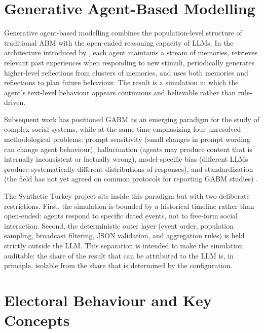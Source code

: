 \documentclass[12pt,a4paper]{report}
\begin{document}
\section{Generative Agent-Based Modelling}
\label{sec:gabm}

Generative agent-based modelling combines the population-level structure of traditional ABM with the open-ended reasoning capacity of LLMs. In the architecture introduced by \citet{park2023generative}, each agent maintains a stream of memories, retrieves relevant past experiences when responding to new stimuli, periodically generates higher-level reflections from clusters of memories, and uses both memories and reflections to plan future behaviour. The result is a simulation in which the agent's text-level behaviour appears continuous and believable rather than rule-driven.

Subsequent work has positioned GABM as an emerging paradigm for the study of complex social systems, while at the same time emphasizing four unresolved methodological problems: prompt sensitivity (small changes in prompt wording can change agent behaviour), hallucination (agents may produce content that is internally inconsistent or factually wrong), model-specific bias (different LLMs produce systematically different distributions of responses), and standardization (the field has not yet agreed on common protocols for reporting GABM studies) \citep{gao2024llmabm,lu2024gabs}.

The Synthetic Turkey project sits inside this paradigm but with two deliberate restrictions. First, the simulation is bounded by a historical timeline rather than open-ended: agents respond to specific dated events, not to free-form social interaction. Second, the deterministic outer layer (event order, population sampling, broadcast filtering, JSON validation, and aggregation rules) is held strictly outside the LLM. This separation is intended to make the simulation auditable: the share of the result that can be attributed to the LLM is, in principle, isolable from the share that is determined by the configuration.

\section{Electoral Behaviour and Key Concepts}
\label{sec:electoral_concepts}
\end{document}
